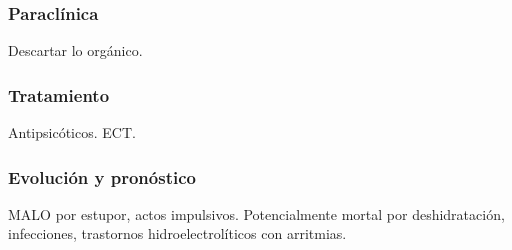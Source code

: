 \documentclass[encares.tex]{subfiles}
\begin{document}
\subsubsection*{Paraclínica}

Descartar lo orgánico.

\subsubsection*{Tratamiento}

Antipsicóticos. ECT.

\subsubsection*{Evolución y pronóstico}

MALO por estupor, actos impulsivos. Potencialmente mortal por deshidratación, infecciones, trastornos hidroelectrolíticos con arritmias.
\end{document}
